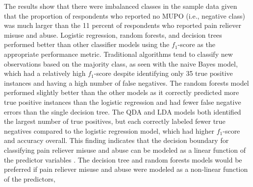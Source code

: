\documentclass[sigconf]{acmart}
\begin{document}
The results show that there were imbalanced classes in the sample data given 
that the proportion of respondents who reported no MUPO (i.e., negative class)
was much larger than the 11 percent of respondents who reported pain reliever 
misuse and abuse. Logistic regression, random forests, and decision trees
performed better than other classifier models using the $f_1$-score as the 
appropriate performance metric. Traditional algorithms tend to classify new 
observations based on the majority class, as seen with the naive Bayes model, 
which had a relatively high $f_1$-score despite identifying only 35 true 
positive instances and having a high number of false negatives. The random 
forests model performed slightly better than the other models as it correctly 
predicted more true positive instances than the logistic regression and had 
fewer false negative errors than the single decision tree. The QDA and LDA 
models both identified the largest number of true positives, but each correctly 
labeled fewer true negatives compared to the logistic regression model, which 
had higher $f_1$-score and accuracy overall. This finding indicates that the 
decision boundary for classifying pain reliever misuse and abuse can be modeled 
as a linear function of the predictor variables \cite{james13, raschka17}. 
The decision tree and random forests models would be preferred if pain reliever 
misuse and abuse were modeled as a non-linear function of the predictors,

\end{document}

